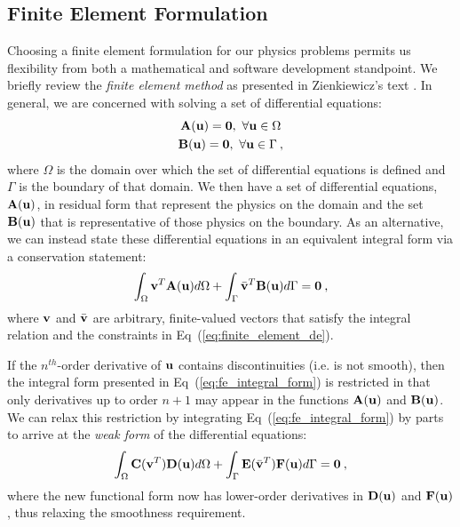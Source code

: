 \subsection{Finite Element Formulation}
\label{subsec:fem_assembly}
Choosing a finite element formulation for our physics problems permits
us flexibility from both a mathematical and software development
standpoint. We briefly review the \textit{finite element method} as
presented in Zienkiewicz's text \citep{zienkiewicz_finite_2005}. In
general, we are concerned with solving a set of differential
equations:
\begin{subequations}
  \begin{gather}
    \mathbf{A}(\mathbf{u}) = \mathbf{0},\ \forall \mathbf{u} \in \Omega \\
    \mathbf{B}(\mathbf{u}) = \mathbf{0},\ \forall \mathbf{u} \in \Gamma\:,
  \end{gather}
  \label{eq:finite_element_de}
\end{subequations}
where $\Omega$ is the domain over which the set of differential
equations is defined and $\Gamma$ is the boundary of that domain. We
then have a set of differential equations, $\mathbf{A}(\mathbf{u})$, in
residual form that represent the physics on the domain and the set
$\mathbf{B}(\mathbf{u})$ that is representative of those physics on the
boundary. As an alternative, we can instead state these differential
equations in an equivalent integral form via a conservation statement:
\begin{equation}
  \int_{\Omega} \mathbf{v}^T \mathbf{A}(\mathbf{u}) d\Omega + \int_{\Gamma}
  \bar{\mathbf{v}}^T \mathbf{B}(\mathbf{u}) d\Gamma = \mathbf{0} \:,
  \label{eq:fe_integral_form}
\end{equation}
where $\mathbf{v}$ and $\bar{\mathbf{v}}$ are arbitrary, finite-valued vectors
that satisfy the integral relation and the constraints in
Eq~(\ref{eq:finite_element_de}).

If the $n^{th}$-order derivative of $\mathbf{u}$ contains discontinuities
(i.e. is not smooth), then the integral form presented in
Eq~(\ref{eq:fe_integral_form}) is restricted in that only derivatives
up to order $n+1$ may appear in the functions $\mathbf{A}(\mathbf{u})$ and
$\mathbf{B}(\mathbf{u})$. We can relax this restriction by integrating
Eq~(\ref{eq:fe_integral_form}) by parts to arrive at the \textit{weak
  form} of the differential equations:
\begin{equation}
  \int_{\Omega} \mathbf{C}(\mathbf{v}^T) \mathbf{D}(\mathbf{u}) d\Omega +
  \int_{\Gamma} \mathbf{E}(\bar{\mathbf{v}}^T) \mathbf{F}(\mathbf{u}) d\Gamma = \mathbf{0}
  \:,
  \label{eq:fe_weak_form}
\end{equation}
where the new functional form now has lower-order derivatives in
$\mathbf{D}(\mathbf{u})$ and $\mathbf{F}(\mathbf{u})$, thus relaxing the smoothness
requirement.

